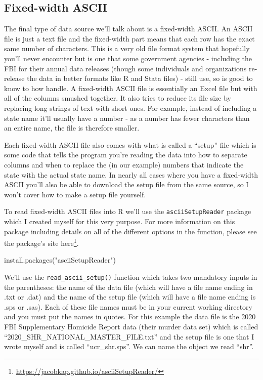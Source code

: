 \documentclass[
]{krantz}
\makeatletter
\newenvironment{Shaded}{\begin{snugshade}}{\end{snugshade}}
\newcommand{\FunctionTok}[1]{\textcolor[rgb]{0,0,0}{#1}}
\newcommand{\NormalTok}[1]{#1}
\newcommand{\StringTok}[1]{\textcolor[rgb]{0.5,0.5,0.5}{#1}}
\renewcommand{\href}[2]{#2\footnote{\url{#1}}}
\newenvironment{kframe}{%
\medskip{}
\setlength{\fboxsep}{.8em}
 \def\at@end@of@kframe{}%
 \ifinner\ifhmode%
  \def\at@end@of@kframe{\end{minipage}}%
  \begin{minipage}{\columnwidth}%
 \fi\fi%
 \def\FrameCommand##1{\hskip\@totalleftmargin \hskip-\fboxsep
 \colorbox{shadecolor}{##1}\hskip-\fboxsep
     \hskip-\linewidth \hskip-\@totalleftmargin \hskip\columnwidth}%
 \MakeFramed {\advance\hsize-\width
   \@totalleftmargin\z@ \linewidth\hsize
   \@setminipage}}%
 {\par\unskip\endMakeFramed%
 \at@end@of@kframe}
\renewenvironment{Shaded}{\begin{kframe}}{\end{kframe}}
\makeatother
\begin{document}
\hypertarget{fixed-width-ascii}{%
\subsection{Fixed-width ASCII}\label{fixed-width-ascii}}

The final type of data source we'll talk about is a fixed-width ASCII. An ASCII file is just a text file and the fixed-width part means that each row has the exact same number of characters. This is a very old file format system that hopefully you'll never encounter but is one that some government agencies - including the FBI for their annual data releases (though some individuals and organizations re-release the data in better formats like R and Stata files) - still use, so is good to know to how handle. A fixed-width ASCII file is essentially an Excel file but with all of the columns smushed together. It also tries to reduce its file size by replacing long strings of text with short ones. For example, instead of including a state name it'll usually have a number - as a number has fewer characters than an entire name, the file is therefore smaller.

Each fixed-width ASCII file also comes with what is called a ``setup'' file which is some code that tells the program you're reading the data into how to separate columns and when to replace the (in our example) numbers that indicate the state with the actual state name. In nearly all cases where you have a fixed-width ASCII you'll also be able to download the setup file from the same source, so I won't cover how to make a setup file yourself.

To read fixed-width ASCII files into R we'll use the \texttt{asciiSetupReader} package which I created myself for this very purpose. For more information on this package including details on all of the different options in the function, please see the package's site \href{https://jacobkap.github.io/asciiSetupReader/}{here}.

\begin{Shaded}
\begin{Highlighting}[]
\FunctionTok{install.packages}\NormalTok{(}\StringTok{"asciiSetupReader"}\NormalTok{)}
\end{Highlighting}
\end{Shaded}

We'll use the \texttt{read\_ascii\_setup()} function which takes two mandatory inputs in the parentheses: the name of the data file (which will have a file name ending in .txt or .dat) and the name of the setup file (which will have a file name ending is .sps or .sas). Each of these file names must be in your current working directory and you must put the names in quotes. For this example the data file is the 2020 FBI Supplementary Homicide Report data (their murder data set) which is called ``2020\_SHR\_NATIONAL\_MASTER\_FILE.txt'' and the setup file is one that I wrote myself and is called ``ucr\_shr.sps''. We can name the object we read ``shr''.
\end{document}
